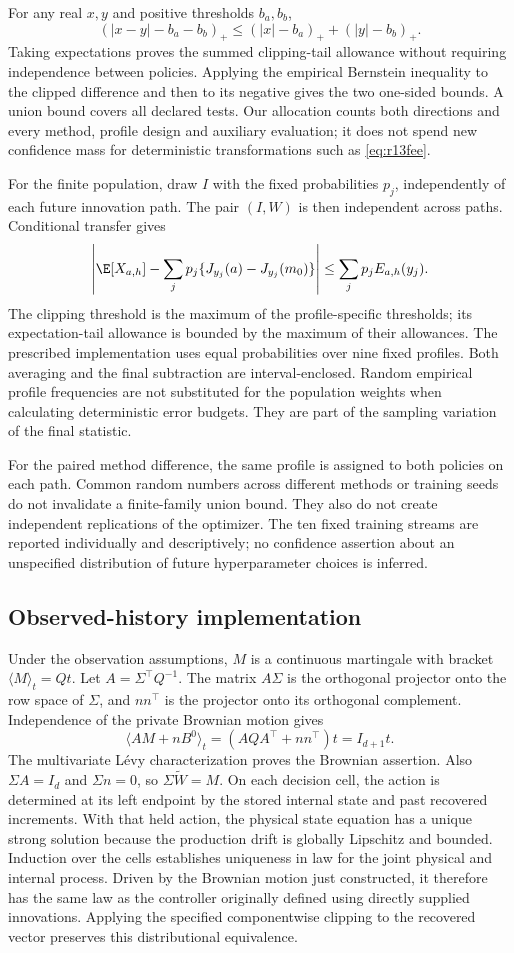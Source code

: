 For any real $x,y$ and positive thresholds $b_a,b_b$,
\[
 (|x-y|-b_a-b_b)_+
       \leq (|x|-b_a)_++(|y|-b_b)_+.
\]
Taking expectations proves the summed clipping-tail allowance without requiring independence between policies. Applying the empirical Bernstein inequality to the clipped difference and then to its negative gives the two one-sided bounds. A union bound covers all declared tests. Our allocation counts both directions and every method, profile design and auxiliary evaluation; it does not spend new confidence mass for deterministic transformations such as \eqref{eq:r13fee}.

For the finite population, draw $I$ with the fixed probabilities $p_j$, independently of each future innovation path. The pair $(I,W)$ is then independent across paths. Conditional transfer gives
\[
 \left|\E[X_{a,h}]-\sum_jp_j\{J_{y_j}(a)-J_{y_j}(m_0)\}\right|
       \leq\sum_jp_j E_{a,h}(y_j).
\]
The clipping threshold is the maximum of the profile-specific thresholds; its expectation-tail allowance is bounded by the maximum of their allowances. The prescribed implementation uses equal probabilities over nine fixed profiles. Both averaging and the final subtraction are interval-enclosed. Random empirical profile frequencies are not substituted for the population weights when calculating deterministic error budgets. They are part of the sampling variation of the final statistic.

For the paired method difference, the same profile is assigned to both policies on each path. Common random numbers across different methods or training seeds do not invalidate a finite-family union bound. They also do not create independent replications of the optimizer. The ten fixed training streams are reported individually and descriptively; no confidence assertion about an unspecified distribution of future hyperparameter choices is inferred.

\subsection{Observed-history implementation}
Under the observation assumptions, $M$ is a continuous martingale with bracket $\langle M\rangle_t=Qt$. Let $A=\Sigma^\top Q^{-1}$. The matrix $A\Sigma$ is the orthogonal projector onto the row space of $\Sigma$, and $nn^\top$ is the projector onto its orthogonal complement. Independence of the private Brownian motion gives
\[
 \langle AM+nB^0\rangle_t
       =(AQA^\top+nn^\top)t=I_{d+1}t.
\]
The multivariate L\'evy characterization proves the Brownian assertion. Also $\Sigma A=I_d$ and $\Sigma n=0$, so $\Sigma\widetilde W=M$. On each decision cell, the action is determined at its left endpoint by the stored internal state and past recovered increments. With that held action, the physical state equation has a unique strong solution because the production drift is globally Lipschitz and bounded. Induction over the cells establishes uniqueness in law for the joint physical and internal process. Driven by the Brownian motion just constructed, it therefore has the same law as the controller originally defined using directly supplied innovations. Applying the specified componentwise clipping to the recovered vector preserves this distributional equivalence.

